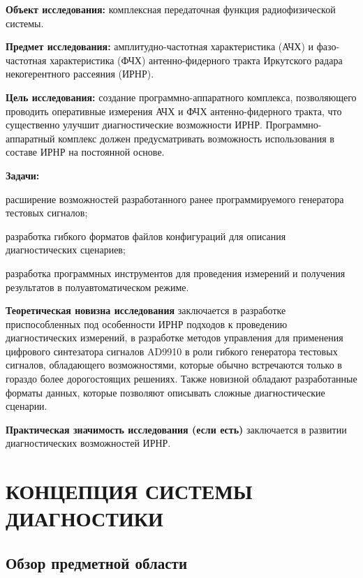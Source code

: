 \documentclass{report}
\begin{document}
{\bf Объект исследования:} комплексная передаточная функция радиофизической системы.

{\bf Предмет исследования:} амплитудно-частотная характеристика (АЧХ) и фазо-частотная характеристика (ФЧХ) антенно-фидерного тракта Иркутского радара некогерентного рассеяния (ИРНР).

{\bf Цель исследования:} создание программно-аппаратного комплекса, позволяющего проводить оперативные измерения АЧХ и ФЧХ антенно-фидерного тракта, что существенно улучшит диагностические возможности ИРНР. Программно-аппаратный комплекс должен предусматривать возможность использования в составе ИРНР на постоянной основе.

{\bf Задачи:}
\begin{enumarabic}
\item расширение возможностей разработанного ранее программируемого генератора тестовых сигналов;
\item разработка гибкого форматов файлов конфигураций для описания диагностических сценариев;
\item разработка программных инструментов для проведения измерений и получения результатов в полуавтоматическом режиме.
\end{enumarabic}


{\bf Теоретическая новизна исследования} заключается в разработке приспособленных под особенности ИРНР подходов к проведению диагностических измерений, в разработке методов управления для применения цифрового синтезатора сигналов AD9910 в роли гибкого генератора тестовых сигналов, обладающего возможностями, которые обычно встречаются только в гораздо более дорогостоящих решениях. Также новизной обладают разработанные форматы данных, которые позволяют описывать сложные диагностические сценарии.

{\bf Практическая значимость исследования (если есть)} заключается в развитии диагностических возможностей ИРНР.

% 
\setcounter{section}{0} %
\setcounter{subsection}{0} %
\setcounter{equation}{0} %

\chapter{КОНЦЕПЦИЯ СИСТЕМЫ ДИАГНОСТИКИ}

\section{Обзор предметной области}
\end{document}
